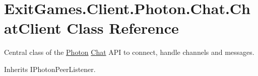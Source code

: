 \hypertarget{class_exit_games_1_1_client_1_1_photon_1_1_chat_1_1_chat_client}{}\section{Exit\+Games.\+Client.\+Photon.\+Chat.\+Chat\+Client Class Reference}
\label{class_exit_games_1_1_client_1_1_photon_1_1_chat_1_1_chat_client}


Central class of the \hyperlink{namespace_exit_games_1_1_client_1_1_photon}{Photon} \hyperlink{namespace_exit_games_1_1_client_1_1_photon_1_1_chat}{Chat} A\+PI to connect, handle channels and messages.  




Inherits I\+Photon\+Peer\+Listener.

